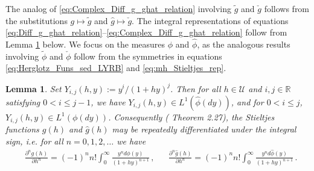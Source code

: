 \documentclass[english,12pt,jmp,graphicx]{revtex4-1}
\newtheorem{lemma}{Lemma}[section]
\newcommand{\ph}{\hat{\phi}}
\begin{document}
%
The analog of \eqref{eq:Complex_Diff_g_ghat_relation}
involving $\tilde{g}$ and $\check{g}$ follows from the
substitutions $g\mapsto\tilde{g}$ and $\hat{g}\mapsto\check{g}$. 
The integral representations of equations
\eqref{eq:Diff_g_ghat_relation}--\eqref{eq:Complex_Diff_g_ghat_relation}
follow from Lemma \ref{lem:L1_Yij} below. We focus on the
measures $\phi$ and $\ph$, as the analogous results involving $\tilde{\phi}$
and $\check{\phi}$ follow from the symmetries in equations
\eqref{eq:Herglotz_Funs_sed_LYRB} and \eqref{eq:mh_Stieltjes_rep}. 

\begin{lemma}\label{lem:L1_Yij}  
  Set $Y_{i,j}(h,y):=y^i/(1+hy)^j$. Then for all $h\in\mathcal{U}$ and
  $i,j\in\mathbb{R}$ satisfying $0<i\leq j-1$, we have
  $Y_{i,j}(h,y)\in L^1(\ph(dy))$, and for $0<i\leq j$,
  $Y_{i,j}(h,y)\in L^1(\phi(dy))$. Consequently (\cite{Folland:95} Theorem
  2.27), the Stieltjes functions $g(h)$ and $\hat{g}(h)$ may be
  repeatedly differentiated under the integral sign, i.e. for all
  $n=0,1,2,\ldots$ we have 
  \begin{align}\label{eq:Integral_rep_g_ghat}
    &\frac{\partial^ng(h)}{\partial h^n}%
                     =(-1)^nn!\int_0^\infty\frac{y^nd\phi(y)}{(1+hy)^{n+1}}\,,
         &&
    \frac{\partial^n\hat{g}(h)}{\partial h^n}%
                     =(-1)^nn!\int_0^\infty\frac{y^nd\ph(y)}{(1+hy)^{n+1}}\,.
  \end{align}
\end{lemma}
%
\end{document}
